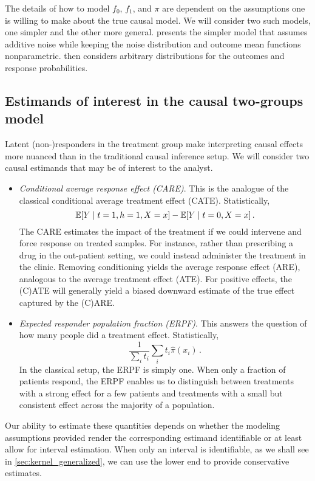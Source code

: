 The details of how to model $f_0$, $f_1$, and $\pi$ are dependent on the assumptions one is willing to make about the true causal model. We will consider two such models, one simpler and the other more general.
 presents the simpler model that assumes additive noise while keeping the noise distribution and outcome mean functions nonparametric.
 then considers arbitrary distributions for the outcomes and response probabilities. 

\subsection{Estimands of interest in the causal two-groups model}
\label{subsec:model:estimands}
Latent (non-)responders in the treatment group make interpreting causal effects more nuanced than in the traditional causal inference setup. We will consider two causal estimands that may be of interest to the analyst.

\begin{itemize}
    \item \emph{Conditional average response effect (CARE)}. This is the analogue of the classical conditional average treatment effect (CATE). Statistically,
    $$\mathbb{E}[Y \mid t=1, h=1, X=x] - \mathbb{E}[Y \mid t=0, X=x] \, .$$
    The CARE estimates the impact of the treatment if we could intervene and force response on treated samples. For instance, rather than prescribing a drug in the out-patient setting, we could instead administer the treatment in the clinic. Removing conditioning yields the average response effect (ARE), analogous to the average treatment effect (ATE). For positive effects, the (C)ATE will generally yield a biased downward estimate of the true effect captured by the (C)ARE.

    \item \emph{Expected responder population fraction (ERPF)}. This answers the question of how many people did a treatment effect. Statistically,
    $$\frac{1}{\sum_i t_i} \sum_i t_i \hat\pi(x_i) \, .$$
    In the classical setup, the ERPF is simply one. When only a fraction of patients respond, the ERPF enables us to distinguish between treatments with a strong effect for a few patients and treatments with a small but consistent effect across the majority of a population.
\end{itemize}

Our ability to estimate these quantities depends on whether the modeling assumptions provided render the corresponding estimand identifiable or at least allow for interval estimation. When only an interval is identifiable, as we shall see in \cref{sec:kernel_generalized}, we can use the lower end to provide conservative estimates.

